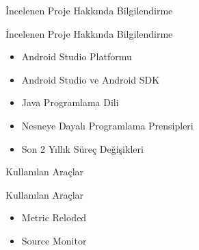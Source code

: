 \documentclass[compress,xcolor=table]{beamer}
\begin{document}
\begin{frame}{İncelenen Proje Hakkında Bilgilendirme}
\begin{block}{İncelenen Proje Hakkında Bilgilendirme}
		
\begin{itemize}
\item Android Studio Platformu
\item Android Studio ve Android SDK
\item Java Programlama Dili
\item Nesneye Dayalı Programlama Prensipleri
\item Son 2 Yıllık Süreç Değişikleri
\end{itemize}
		
\end{block}


\end{frame}
\begin{frame}{Kullanılan Araçlar}
\begin{block}{Kullanılan Araçlar}
		
\begin{itemize}
\item Metric Reloded
\item Source Monitor
\end{itemize}
		
\end{block}


\end{frame}
\end{document}
